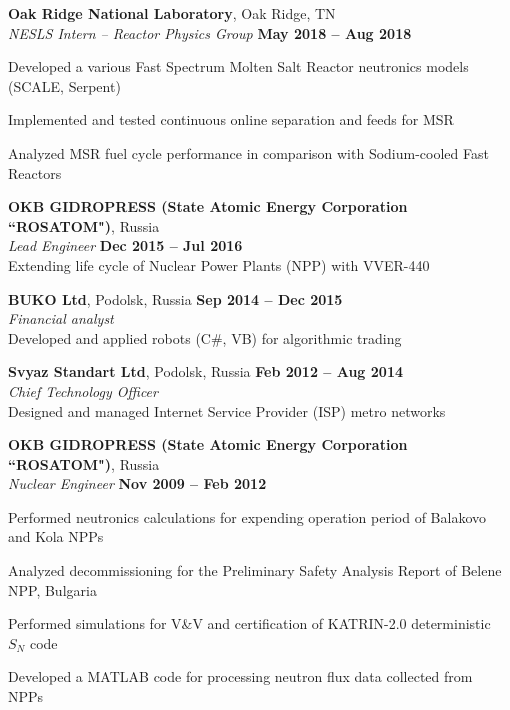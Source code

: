 \documentclass[margin,line]{resume}
\begin{document}
\begin{resume}
    \textbf{Oak Ridge National Laboratory}, Oak Ridge, TN\\
		\textsl{NESLS Intern -- Reactor Physics Group} \hfill \textbf{May 2018 
		-- Aug 2018}\\
                \vspace{-4mm}\begin{list2}
                \item Developed a various Fast Spectrum Molten Salt Reactor 
                neutronics models (SCALE, Serpent)
				\item Implemented and tested continuous online separation and 
				feeds for MSR
				\item Analyzed MSR fuel cycle performance in comparison with 
				Sodium-cooled Fast Reactors
                \end{list2}

    \textbf{OKB GIDROPRESS (State Atomic Energy Corporation ``ROSATOM")}, 
    Russia \\
		\textsl{Lead Engineer} \hfill \textbf{Dec 2015 -- Jul 2016}\\
                Extending life cycle of Nuclear Power Plants (NPP) with 
                VVER-440

    \textbf{BUKO Ltd}, Podolsk, Russia \hfill \textbf{Sep 2014 -- Dec 2015}\\
		\textsl{Financial analyst}\\
		Developed and applied robots (C\#, VB) for algorithmic trading

    \textbf{Svyaz Standart Ltd}, Podolsk, Russia \hfill \textbf{Feb 2012 -- Aug 2014}\\
		\textsl{Chief Technology Officer}\\
		Designed and managed Internet Service Provider (ISP) metro networks

    \textbf{OKB GIDROPRESS (State Atomic Energy Corporation ``ROSATOM")}, 
    Russia \\
		\textsl{Nuclear Engineer} \hfill \textbf{Nov 2009 -- Feb 2012}\\
                \vspace{-4mm}\begin{list2}
				\item Performed neutronics calculations for expending 
				operation period of Balakovo and Kola NPPs
				\item Analyzed decommissioning for the Preliminary Safety 
				Analysis Report of Belene NPP, Bulgaria
				\item Performed simulations for V\&V and certification of  
				KATRIN-2.0 deterministic $S_N$ code
				\item Developed a MATLAB code for processing neutron flux data 
				collected from NPPs
                \end{list2}


\end{resume}
\end{document}
